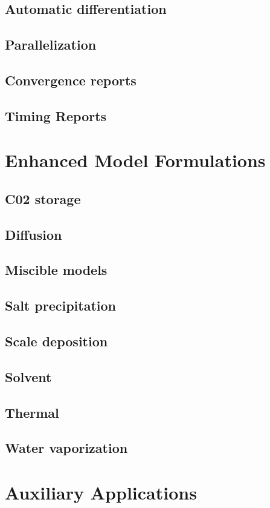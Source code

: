 \documentclass{elsarticle}
\begin{document}
\subsection{Automatic differentiation}
\subsection{Parallelization}
\subsection{Convergence reports}
\subsection{Timing Reports}

\section{Enhanced Model Formulations}
\subsection{C02 storage}
\subsection{Diffusion}
\subsection{Miscible models}
\subsection{Salt precipitation}
\subsection{Scale deposition}
\subsection{Solvent}
\subsection{Thermal}
\subsection{Water vaporization}

\section{Auxiliary Applications}
\end{document}

